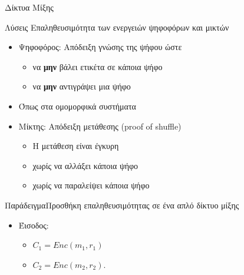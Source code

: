 \documentclass[handout]{beamer}
\begin{document}
\begin{section}{Δίκτυα Μίξης}
\begin{frame}{Λύσεις}
Επαληθευσιμότητα των ενεργειών ψηφοφόρων και μικτών \pause 
\begin{itemize}
  \item Ψηφοφόρος: Απόδειξη γνώσης της ψήφου ώστε 
  \begin{itemize}
   \item να \textbf{μην} βάλει ετικέτα σε κάποια ψήφο
   \item να \textbf{μην}  αντιγράψει μια ψήφο
  \end{itemize} \pause 
  \item Όπως στα ομομορφικά συστήματα \pause 
  \item Μίκτης: Απόδειξη μετάθεσης (proof of shuffle)
  \begin{itemize}
   \item Η μετάθεση είναι έγκυρη
   \item χωρίς να αλλάξει κάποια ψήφο
   \item χωρίς να παραλείψει κάποια ψήφο 
  \end{itemize}
\end{itemize}
\end{frame}
 
\begin{frame}[allowframebreaks]{Παράδειγμα}{Προσθήκη επαληθευσιμότητας σε ένα απλό δίκτυο μίξης} 

\begin{multicols}{2}
    \begin{itemize}
        \item Έισοδος: 
        \begin{itemize}
            \item  $C_1 = Enc(m_1,r_1)$
            \item $C_2 = Enc(m_2,r_2)$.
        \end{itemize}
        

\end{itemize}
\end{multicols}
\end{frame}
\end{section}
\end{document}
